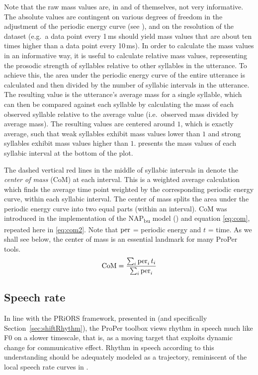 Note that the raw mass values are, in and of themselves, not very informative. The absolute values are contingent on various degrees of freedom in the adjustment of the periodic energy curve (see ), and on the resolution of the dataset (e.g.~a data point every 1\,ms should yield mass values that are about ten times higher than a data point every 10\,ms).
In order to calculate the mass values in an informative way, it is useful to calculate relative mass values, representing the prosodic strength of syllables relative to other syllables in the utterance. To achieve this, the area under the periodic energy curve of the entire utterance is calculated and then divided by the number of syllabic intervals in the utterance. The resulting value is the utterance's average mass for a single syllable, which can then be compared against each syllable by calculating the mass of each observed syllable relative to the average value (i.e.~observed mass divided by average mass). The resulting values are centered around \(1\), which is exactly average, such that weak syllables exhibit mass values lower than \(1\) and strong syllables exhibit mass values higher than \(1\).  presents the mass values of each syllabic interval at the bottom of the plot.

The dashed vertical red lines in the middle of syllabic intervals in  denote the \emph{center of mass} (CoM) at each interval. This is a weighted average calculation which finds the average time point weighted by the corresponding periodic energy curve, within each syllabic interval.
The center of mass splits the area under the periodic energy curve into two equal parts (within an interval).
CoM was introduced in the implementation of the NAP\textsubscript{bu} model () and equation \eqref{eq:com}, repeated here in \eqref{eq:com2}. Note that \(\operatorname{per}\) = periodic energy and \(t\) = time. As we shall see below, the center of mass is an essential landmark for many ProPer tools.
\begin{equation}
 \text{CoM} = \frac{\sum_i \operatorname{per}_i t_i}{\sum_i \operatorname{per}_i}  \label{eq:com2}
\end{equation}

\subsection{Speech rate}\label{sec:speechRate}

In line with the PRiORS framework, presented in  (and specifically Section~\ref{sec:shiftRhythm}), the ProPer toolbox views rhythm in speech much like F0 on a slower timescale, that is, as a moving target that exploits dynamic change for communicative effect. Rhythm in speech according to this understanding should be adequately modeled as a trajectory, reminiscent of the local speech rate curves in \citet{pfitzinger2001phonetischesk}.

